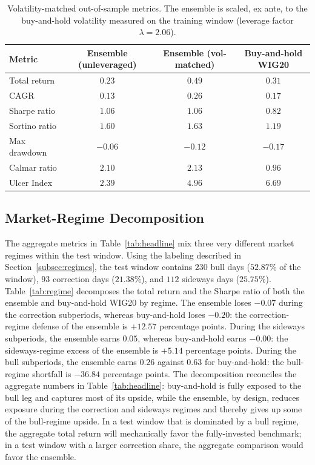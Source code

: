 \documentclass{ieeeaccess}
\newcommand{\TRtest}{\ensuremath{0.23}}
\newcommand{\Shtest}{\ensuremath{1.06}}
\newcommand{\MDDtest}{\ensuremath{-0.06}}
\newcommand{\Calmtest}{\ensuremath{2.10}}
\newcommand{\CAGRtest}{\ensuremath{0.13}}
\newcommand{\BHtest}{\ensuremath{0.31}}
\newcommand{\BHsharpe}{\ensuremath{0.82}}
\newcommand{\MDDbh}{\ensuremath{-0.17}}
\newcommand{\CAGRbh}{\ensuremath{0.17}}
\newcommand{\Calmbh}{\ensuremath{0.96}}
\newcommand{\EnsSortino}{\ensuremath{1.60}}
\newcommand{\BHSortino}{\ensuremath{1.19}}
\newcommand{\EnsUlcer}{\ensuremath{2.39}}
\newcommand{\BHUlcer}{\ensuremath{6.69}}
\newcommand{\VolScaledTR}{\ensuremath{0.49}}
\newcommand{\VolScaledCAGR}{\ensuremath{0.26}}
\newcommand{\VolScaledSharpe}{\ensuremath{1.06}}
\newcommand{\VolScaledMDD}{\ensuremath{-0.12}}
\newcommand{\VolScaledCalmar}{\ensuremath{2.13}}
\newcommand{\VolScaledSortino}{\ensuremath{1.63}}
\newcommand{\VolScaledUlcer}{\ensuremath{4.96}}
\newcommand{\Leverage}{\ensuremath{2.06}}
\newcommand{\RegBullDays}{\ensuremath{230}}
\newcommand{\RegCorrectionDays}{\ensuremath{93}}
\newcommand{\RegSidewaysDays}{\ensuremath{112}}
\newcommand{\RegBullShare}{52.87\%}
\newcommand{\RegCorrectionShare}{21.38\%}
\newcommand{\RegSidewaysShare}{25.75\%}
\newcommand{\EnsBullTR}{\ensuremath{0.26}}
\newcommand{\EnsCorrectionTR}{\ensuremath{-0.07}}
\newcommand{\EnsSidewaysTR}{\ensuremath{0.05}}
\newcommand{\BHBullTR}{\ensuremath{0.63}}
\newcommand{\BHCorrectionTR}{\ensuremath{-0.20}}
\newcommand{\BHSidewaysTR}{\ensuremath{-0.00}}
\newcommand{\CorrectionDefencePP}{\ensuremath{+12.57}}
\newcommand{\SidewaysExcessPP}{\ensuremath{+5.14}}
\newcommand{\BullShortfallPP}{\ensuremath{-36.84}}
\begin{document}
\begin{table}[t]
\centering
\caption{Volatility-matched out-of-sample metrics. The ensemble is scaled, ex ante, to the buy-and-hold volatility measured on the training window (leverage factor $\lambda = \Leverage{}$).}
\label{tab:volmatched}
\begin{tabular}{lccc}
\toprule
Metric & Ensemble (unleveraged) & Ensemble (vol-matched) & Buy-and-hold WIG20 \\
\midrule
Total return     & $\TRtest$     & $\VolScaledTR$      & $\BHtest$ \\
CAGR             & $\CAGRtest$   & $\VolScaledCAGR$    & $\CAGRbh$ \\
Sharpe ratio     & $\Shtest$     & $\VolScaledSharpe$  & $\BHsharpe$ \\
Sortino ratio    & $\EnsSortino$ & $\VolScaledSortino$ & $\BHSortino$ \\
Max drawdown     & $\MDDtest$    & $\VolScaledMDD$     & $\MDDbh$ \\
Calmar ratio     & $\Calmtest$   & $\VolScaledCalmar$  & $\Calmbh$ \\
Ulcer Index      & $\EnsUlcer$   & $\VolScaledUlcer$   & $\BHUlcer$ \\
\bottomrule
\end{tabular}
\end{table}

\subsection{Market-Regime Decomposition}
\label{subsec:regime}

The aggregate metrics in Table~\ref{tab:headline} mix three very different market regimes within the test window. Using the labeling described in Section~\ref{subsec:regimes}, the test window contains \RegBullDays{} bull days ($\RegBullShare{}$ of the window), \RegCorrectionDays{} correction days ($\RegCorrectionShare{}$), and \RegSidewaysDays{} sideways days ($\RegSidewaysShare{}$). Table~\ref{tab:regime} decomposes the total return and the Sharpe ratio of both the ensemble and buy-and-hold WIG20 by regime. The ensemble loses $\EnsCorrectionTR{}$ during the correction subperiods, whereas buy-and-hold loses $\BHCorrectionTR{}$: the correction-regime defense of the ensemble is \CorrectionDefencePP{} percentage points. During the sideways subperiods, the ensemble earns $\EnsSidewaysTR{}$, whereas buy-and-hold earns $\BHSidewaysTR{}$: the sideways-regime excess of the ensemble is \SidewaysExcessPP{} percentage points. During the bull subperiods, the ensemble earns $\EnsBullTR{}$ against $\BHBullTR{}$ for buy-and-hold: the bull-regime shortfall is \BullShortfallPP{} percentage points. The decomposition reconciles the aggregate numbers in Table~\ref{tab:headline}: buy-and-hold is fully exposed to the bull leg and captures most of its upside, while the ensemble, by design, reduces exposure during the correction and sideways regimes and thereby gives up some of the bull-regime upside. In a test window that is dominated by a bull regime, the aggregate total return will mechanically favor the fully-invested benchmark; in a test window with a larger correction share, the aggregate comparison would favor the ensemble.
\end{document}
